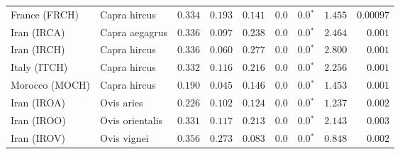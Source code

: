 \begin{center}
\begin{adjustbox}{width = 1\textwidth}
\begin{tabular}{|l|l|r|r|r|r|r|r|r|}
                  France (FRCH) &         Capra hircus &                                        $ 0.334$ &                                           $ 0.193$ &                      $ 0.141$ &            $0.0$ &                  $\bm{0.0{^*}}$ &                                           $ 1.455$ &          $0.00097$ \\
                    Iran (IRCA) &       Capra aegagrus &                                        $ 0.336$ &                                           $ 0.097$ &                      $ 0.238$ &            $0.0$ &                  $\bm{0.0{^*}}$ &                                           $ 2.464$ &           $ 0.001$ \\
                    Iran (IRCH) &         Capra hircus &                                        $ 0.336$ &                                           $ 0.060$ &                      $ 0.277$ &            $0.0$ &                  $\bm{0.0{^*}}$ &                                           $ 2.800$ &           $ 0.001$ \\
                   Italy (ITCH) &         Capra hircus &                                        $ 0.332$ &                                           $ 0.116$ &                      $ 0.216$ &            $0.0$ &                  $\bm{0.0{^*}}$ &                                           $ 2.256$ &           $ 0.001$ \\
                 Morocco (MOCH) &         Capra hircus &                                        $ 0.190$ &                                           $ 0.045$ &                      $ 0.146$ &            $0.0$ &                  $\bm{0.0{^*}}$ &                                           $ 1.453$ &           $ 0.001$ \\
                    Iran (IROA) &           Ovis aries &                                        $ 0.226$ &                                           $ 0.102$ &                      $ 0.124$ &            $0.0$ &                  $\bm{0.0{^*}}$ &                                           $ 1.237$ &           $ 0.002$ \\
                    Iran (IROO) &      Ovis orientalis &                                        $ 0.331$ &                                           $ 0.117$ &                      $ 0.213$ &            $0.0$ &                  $\bm{0.0{^*}}$ &                                           $ 2.143$ &           $ 0.003$ \\
                    Iran (IROV) &          Ovis vignei &                                        $ 0.356$ &                                           $ 0.273$ &                      $ 0.083$ &            $0.0$ &                  $\bm{0.0{^*}}$ &                                           $ 0.848$ &           $ 0.002$ \\

\end{tabular}
\end{adjustbox}
\end{center}
